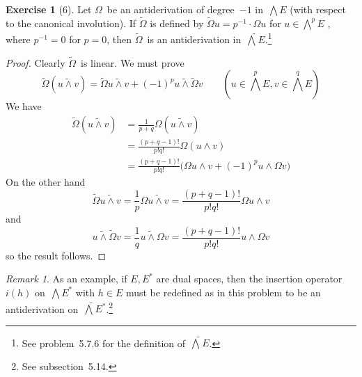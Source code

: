 \documentclass[letterpaper,12pt]{article}
\newcommand{\mult}{\cdot}
\newcommand{\eprod}{\wedge}
\newcommand{\eprodf}{\mathbin{\tilde{\wedge}}}
\newcommand{\bigeprod}{\bigwedge}
\newcommand{\medeprod}{{\textstyle\bigeprod}}
\newcommand{\medeprodf}{\tilde{\medeprod}}
\theoremstyle{definition}
\newtheorem*{exer}{Exercise}
\theoremstyle{remark}
\newtheorem*{rmk}{Remark}
\begin{document}
\begin{exer}[6]
Let \(\Omega\)~be an antiderivation of degree~\(-1\) in~\(\medeprod E\) (with respect to the canonical involution). If \(\widetilde{\Omega}\) is defined by \(\widetilde{\Omega}u=p^{-1}\mult\Omega u\) for \(u\in\medeprod^p E\) , where \(p^{-1}=0\) for \(p=0\), then \(\widetilde{\Omega}\)~is an antiderivation in~\(\medeprodf E\).\footnote{See problem~5.7.6 for the definition of~\(\medeprodf E\).}
\end{exer}
\begin{proof}
Clearly \(\widetilde{\Omega}\)~is linear. We must prove
\[\widetilde{\Omega}(u\eprodf v)=\widetilde{\Omega}u\eprodf v+(-1)^pu\eprodf\widetilde{\Omega}v\qquad(u\in\medeprod^p E,v\in\medeprod^q E)\]
We have
\begin{align*}
\widetilde{\Omega}(u\eprodf v)&=\frac{1}{p+q}\Omega(u\eprodf v)\\
	&=\frac{(p+q-1)!}{p!q!}\Omega(u\eprod v)\\
	&=\frac{(p+q-1)!}{p!q!}\bigl(\Omega u\eprod v+(-1)^pu\eprod\Omega v\bigr)
\end{align*}
On the other hand
\[\widetilde{\Omega}u\eprodf v=\frac{1}{p}\Omega u\eprodf v=\frac{(p+q-1)!}{p!q!}\Omega u\eprod v\]
and
\[u\eprodf\widetilde{\Omega}v=\frac{1}{q}u\eprodf\Omega v=\frac{(p+q-1)!}{p!q!}u\eprod\Omega v\]
so the result follows.
\end{proof}
\begin{rmk}
As an example, if \(E,E^*\) are dual spaces, then the insertion operator~\(i(h)\) on~\(\medeprod E^*\) with \(h\in E\) must be redefined as in this problem to be an antiderivation on~\(\medeprodf E^*\).\footnote{See subsection~5.14.}
\end{rmk}
\end{document}

